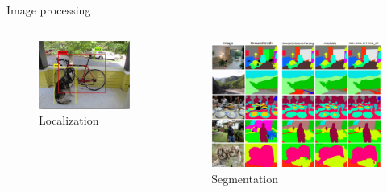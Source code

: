 \begin{frame}{Image processing}
	\begin{columns}
		\begin{column}{.5\textwidth}
			\begin{figure}
				\includegraphics[width=.9\textwidth, center]{figures/object_locationzation_eg1.png}
				\caption*{Localization}
			\end{figure}
		\end{column}
		\begin{column}{.5\textwidth}
			\begin{figure}
				\includegraphics[width=.9\textwidth, center]{figures/semantic_segmentation_eg1.png}
				\caption*{Segmentation}
			\end{figure}
		\end{column}
	\end{columns}
\end{frame}

